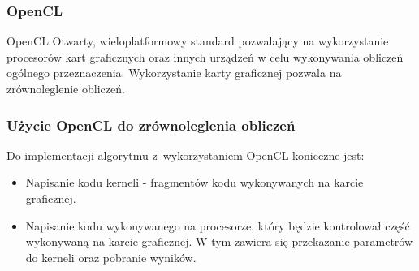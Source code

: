 \begin{frame}
	\frametitle{OpenCL}
	\begin{block}{OpenCL}
		Otwarty, wieloplatformowy standard pozwalający na wykorzystanie procesorów kart graficznych oraz innych urządzeń w celu wykonywania obliczeń ogólnego przeznaczenia. Wykorzystanie karty graficznej pozwala na zrównoleglenie obliczeń.
	\end{block}

\end{frame}


\begin{frame}
	\frametitle{Użycie OpenCL do zrównoleglenia obliczeń}

	Do implementacji algorytmu z~wykorzystaniem OpenCL konieczne jest:
	\begin{itemize}
		\item Napisanie kodu kerneli - fragmentów kodu wykonywanych na karcie graficznej.
		\item Napisanie kodu wykonywanego na procesorze, który będzie kontrolował część wykonywaną na karcie graficznej. W tym zawiera się przekazanie parametrów do kerneli oraz pobranie wyników.
	\end{itemize}

\end{frame}


